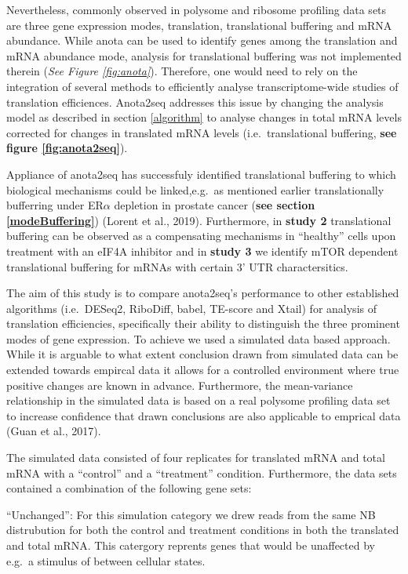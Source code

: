 \documentclass[12pt,openany]{book}
\begin{document}
Nevertheless, commonly observed in polysome and ribosome profiling data
sets are three gene expression modes, translation, translational
buffering and mRNA abundance. While anota can be used to identify genes
among the translation and mRNA abundance mode, analysis for
translational buffering was not implemented therein (\emph{See Figure
\ref{fig:anota}}). Therefore, one would need to rely on the integration
of several methods to efficiently analyse transcriptome-wide studies of
translation efficiences. Anota2seq addresses this issue by changing the
analysis model as described in section \ref{algorithm} to analyse
changes in total mRNA levels corrected for changes in translated mRNA
levels (i.e.~translational buffering, \textbf{see figure
\ref{fig:anota2seq}}).

Appliance of anota2seq has successfuly identified translational
buffering to which biological mechanisms could be linked,e.g.~as
mentioned earlier translationally bufferring under ER\(\alpha\)
depletion in prostate cancer (\textbf{see section \ref{modeBuffering}})
(Lorent et al., 2019). Furthermore, in \textbf{study 2} translational
buffering can be observed as a compensating mechanisms in ``healthy''
cells upon treatment with an eIF4A inhibitor and in \textbf{study 3} we
identify mTOR dependent translational buffering for mRNAs with certain
3' UTR charactersitics.

The aim of this study is to compare anota2seq's performance to other
established algorithms (i.e.~DESeq2, RiboDiff, babel, TE-score and
Xtail) for analysis of translation efficiencies, specifically their
ability to distinguish the three prominent modes of gene expression. To
achieve we used a simulated data based approach. While it is arguable to
what extent conclusion drawn from simulated data can be extended towards
empircal data it allows for a controlled environment where true positive
changes are known in advance. Furthermore, the mean-variance
relationship in the simulated data is based on a real polysome profiling
data set to increase confidence that drawn conclusions are also
applicable to emprical data (Guan et al., 2017).

The simulated data consisted of four replicates for translated mRNA and
total mRNA with a ``control'' and a ``treatment'' condition.
Furthermore, the data sets contained a combination of the following gene
sets:

``Unchanged'': For this simulation category we drew reads from the same
NB distrubution for both the control and treatment conditions in both
the translated and total mRNA. This catergory reprents genes that would
be unaffected by e.g.~a stimulus of between cellular states.
\end{document}
